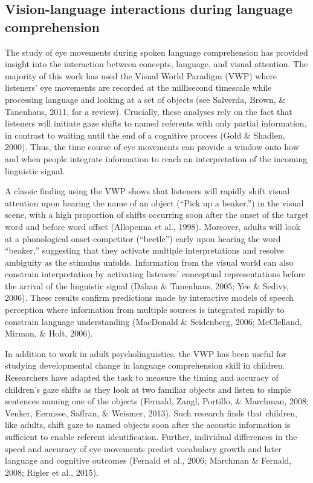 \documentclass[,man,floatsintext]{apa6}
\begin{document}
\hypertarget{vision-language-interactions-during-language-comprehension}{%
\subsection{Vision-language interactions during language comprehension}\label{vision-language-interactions-during-language-comprehension}}

The study of eye movements during spoken language comprehension has provided insight into the interaction between concepts, language, and visual attention. The majority of this work has used the Visual World Paradigm (VWP) where listeners' eye movements are recorded at the millisecond timescale while processing language and looking at a set of objects (see Salverda, Brown, \& Tanenhaus, 2011, for a review). Crucially, these analyses rely on the fact that listeners will initiate gaze shifts to named referents with only partial information, in contrast to waiting until the end of a cognitive process (Gold \& Shadlen, 2000). Thus, the time course of eye movements can provide a window onto how and when people integrate information to reach an interpretation of the incoming linguistic signal.

A classic finding using the VWP shows that listeners will rapidly shift visual attention upon hearing the name of an object (\enquote{Pick up a beaker.}) in the visual scene, with a high proportion of shifts occurring soon after the onset of the target word and before word offset (Allopenna et al., 1998). Moreover, adults will look at a phonological onset-competitor (\enquote{beetle}) early upon hearing the word \enquote{beaker,} suggesting that they activate multiple interpretations and resolve ambiguity as the stimulus unfolds. Information from the visual world can also constrain interpretation by activating listeners' conceptual representations before the arrival of the linguistic signal (Dahan \& Tanenhaus, 2005; Yee \& Sedivy, 2006). These results confirm predictions made by interactive models of speech perception where information from multiple sources is integrated rapidly to constrain language understanding (MacDonald \& Seidenberg, 2006; McClelland, Mirman, \& Holt, 2006).

In addition to work in adult psycholinguistics, the VWP has been useful for studying developmental change in language comprehension skill in children. Researchers have adapted the task to measure the timing and accuracy of children's gaze shifts as they look at two familiar objects and listen to simple sentences naming one of the objects (Fernald, Zangl, Portillo, \& Marchman, 2008; Venker, Eernisse, Saffran, \& Weismer, 2013). Such research finds that children, like adults, shift gaze to named objects soon after the acoustic information is sufficient to enable referent identification. Further, individual differences in the speed and accuracy of eye movements predict vocabulary growth and later language and cognitive outcomes (Fernald et al., 2006; Marchman \& Fernald, 2008; Rigler et al., 2015).
\end{document}
